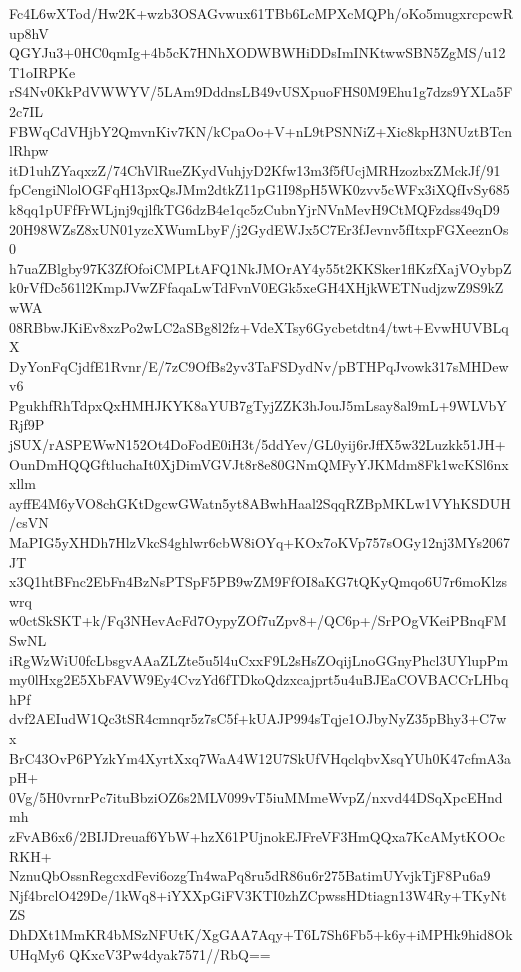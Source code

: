 Fc4L6wXTod/Hw2K+wzb3OSAGvwux61TBb6LcMPXcMQPh/oKo5mugxrcpcwRup8hV
QGYJu3+0HC0qmIg+4b5cK7HNhXODWBWHiDDsImINKtwwSBN5ZgMS/u12T1oIRPKe
rS4Nv0KkPdVWWYV/5LAm9DddnsLB49vUSXpuoFHS0M9Ehu1g7dzs9YXLa5F2c7IL
FBWqCdVHjbY2QmvnKiv7KN/kCpaOo+V+nL9tPSNNiZ+Xic8kpH3NUztBTcnlRhpw
itD1uhZYaqxzZ/74ChVlRueZKydVuhjyD2Kfw13m3f5fUcjMRHzozbxZMckJf/91
fpCengiNlolOGFqH13pxQsJMm2dtkZ11pG1I98pH5WK0zvv5cWFx3iXQfIvSy685
k8qq1pUFfFrWLjnj9qjlfkTG6dzB4e1qc5zCubnYjrNVnMevH9CtMQFzdss49qD9
20H98WZsZ8xUN01yzcXWumLbyF/j2GydEWJx5C7Er3fJevnv5fItxpFGXeeznOs0
h7uaZBlgby97K3ZfOfoiCMPLtAFQ1NkJMOrAY4y55t2KKSker1flKzfXajVOybpZ
k0rVfDc561l2KmpJVwZFfaqaLwTdFvnV0EGk5xeGH4XHjkWETNudjzwZ9S9kZwWA
08RBbwJKiEv8xzPo2wLC2aSBg8l2fz+VdeXTsy6Gycbetdtn4/twt+EvwHUVBLqX
DyYonFqCjdfE1Rvnr/E/7zC9OfBs2yv3TaFSDydNv/pBTHPqJvowk317sMHDewv6
PgukhfRhTdpxQxHMHJKYK8aYUB7gTyjZZK3hJouJ5mLsay8al9mL+9WLVbYRjf9P
jSUX/rASPEWwN152Ot4DoFodE0iH3t/5ddYev/GL0yij6rJffX5w32Luzkk51JH+
OunDmHQQGftluchaIt0XjDimVGVJt8r8e80GNmQMFyYJKMdm8Fk1wcKSl6nxxllm
ayffE4M6yVO8chGKtDgcwGWatn5yt8ABwhHaal2SqqRZBpMKLw1VYhKSDUH/csVN
MaPIG5yXHDh7HlzVkcS4ghlwr6cbW8iOYq+KOx7oKVp757sOGy12nj3MYs2067JT
x3Q1htBFnc2EbFn4BzNsPTSpF5PB9wZM9FfOI8aKG7tQKyQmqo6U7r6moKlzswrq
w0ctSkSKT+k/Fq3NHevAcFd7OypyZOf7uZpv8+/QC6p+/SrPOgVKeiPBnqFMSwNL
iRgWzWiU0fcLbsgvAAaZLZte5u5l4uCxxF9L2sHsZOqijLnoGGnyPhcl3UYlupPm
my0lHxg2E5XbFAVW9Ey4CvzYd6fTDkoQdzxcajprt5u4uBJEaCOVBACCrLHbqhPf
dvf2AEIudW1Qc3tSR4cmnqr5z7sC5f+kUAJP994sTqje1OJbyNyZ35pBhy3+C7wx
BrC43OvP6PYzkYm4XyrtXxq7WaA4W12U7SkUfVHqclqbvXsqYUh0K47cfmA3apH+
0Vg/5H0vrnrPc7ituBbziOZ6s2MLV099vT5iuMMmeWvpZ/nxvd44DSqXpcEHndmh
zFvAB6x6/2BIJDreuaf6YbW+hzX61PUjnokEJFreVF3HmQQxa7KcAMytKOOcRKH+
NznuQbOssnRegcxdFevi6ozgTn4waPq8ru5dR86u6r275BatimUYvjkTjF8Pu6a9
Njf4brclO429De/1kWq8+iYXXpGiFV3KTI0zhZCpwssHDtiagn13W4Ry+TKyNtZS
DhDXt1MmKR4bMSzNFUtK/XgGAA7Aqy+T6L7Sh6Fb5+k6y+iMPHk9hid8OkUHqMy6
QKxcV3Pw4dyak7571//RbQ==
